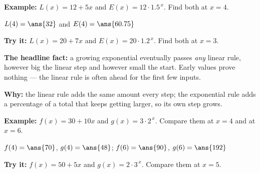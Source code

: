 \documentclass[12pt]{article}
\begin{document}
\begin{examplebox}
\textbf{Example:} \quad $L(x) = 12 + 5x$ and $E(x) = 12 \cdot 1.5^{\,x}$. Find both at $x = 4$.

$L(4) = \ans{32}$ \quad and \quad $E(4) = \ans{60.75}$
\end{examplebox}

\begin{tryitbox}
\textbf{Try it:} \quad $L(x) = 20 + 7x$ and $E(x) = 20 \cdot 1.2^{\,x}$. Find both at $x = 3$.\\[2pt]
\end{tryitbox}


\begin{formulabox}
\textbf{The headline fact:} a growing exponential eventually passes \emph{any} linear rule, however big the linear step and however small the start. Early values prove nothing --- the linear rule is often ahead for the first few inputs.\par
\textbf{Why:} the linear rule adds the same amount every step; the exponential rule adds a percentage of a total that keeps getting larger, so its own step grows.
\end{formulabox}

\begin{examplebox}
\textbf{Example:} \quad $f(x) = 30 + 10x$ and $g(x) = 3 \cdot 2^{\,x}$. Compare them at $x = 4$ and at $x = 6$.

$f(4) = \ans{70}$, $g(4) = \ans{48}$; \quad $f(6) = \ans{90}$, $g(6) = \ans{192}$
\end{examplebox}

\begin{tryitbox}
\textbf{Try it:} \quad $f(x) = 50 + 5x$ and $g(x) = 2 \cdot 3^{\,x}$. Compare them at $x = 5$.\\[2pt]
\end{tryitbox}
\end{document}
